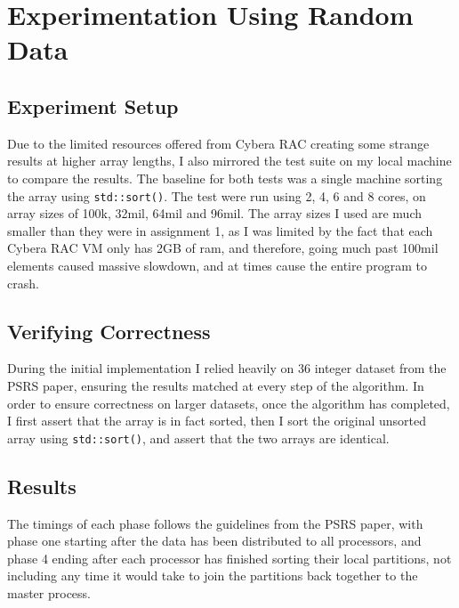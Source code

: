 \documentclass[11pt]{report}
\begin{document}
\section*{Experimentation Using Random Data}
\subsection*{Experiment Setup}
Due to the limited resources offered from Cybera RAC creating some strange results
at higher array lengths, I also mirrored the test suite on my local machine to
compare the results. The baseline for both tests was a single machine sorting the
array using \verb|std::sort()|. The test were run using 2, 4, 6 and 8 cores, on array sizes of 100k, 32mil, 64mil and 96mil. The array sizes I used are much smaller
than they were in assignment 1, as I was limited by the fact that each Cybera RAC
VM only has 2GB of ram, and therefore, going much past 100mil elements caused 
massive slowdown, and at times cause the entire program to crash.
\subsection*{Verifying Correctness}
During the initial implementation I relied heavily on 36 integer dataset from the 
PSRS paper, ensuring the results matched at every step of the algorithm. In order to ensure correctness on larger datasets, once the algorithm has completed, I first assert that the array is in fact sorted, then I sort the original unsorted array using \verb|std::sort()|, and assert that the two arrays are identical.
\subsection*{Results}
The timings of each phase follows the guidelines from the PSRS paper, with phase one starting after the data has been distributed to all processors, and phase 4 ending
after each processor has finished sorting their local partitions, not including any time it would take to join the partitions back together to the master process.\\
\end{document}
